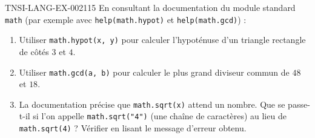 \begin{exercice}{TNSI-LANG-EX-002}{1}{15}
En consultant la documentation du module standard \lstinline{math} (par exemple avec \lstinline{help(math.hypot)} et \lstinline{help(math.gcd)}) :
\begin{enumerate}
  \item Utiliser \lstinline{math.hypot(x, y)} pour calculer l'hypoténuse d'un triangle rectangle de côtés $3$ et $4$.
  \item Utiliser \lstinline{math.gcd(a, b)} pour calculer le plus grand diviseur commun de $48$ et $18$.
  \item La documentation précise que \lstinline{math.sqrt(x)} attend un nombre. Que se passe-t-il si l'on appelle \lstinline{math.sqrt("4")} (une chaîne de caractères) au lieu de \lstinline{math.sqrt(4)} ? Vérifier en lisant le message d'erreur obtenu.
\end{enumerate}
\end{exercice}
